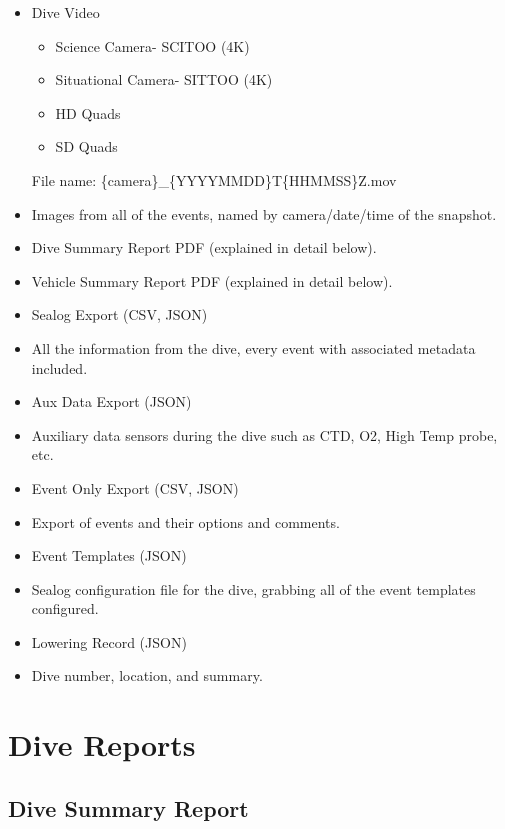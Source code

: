 \documentclass[
  letterpaper,
  DIV=11,
  numbers=noendperiod]{scrreprt}
\providecommand{\tightlist}{%
  \setlength{\itemsep}{0pt}\setlength{\parskip}{0pt}}\usepackage{longtable,booktabs,array}
\begin{document}
\begin{itemize}
\item
  Dive Video

  \begin{itemize}
  \tightlist
  \item
    Science Camera- SCITOO (4K)
  \item
    Situational Camera- SITTOO (4K)
  \item
    HD Quads
  \item
    SD Quads
  \end{itemize}

  File name: \{camera\}\_\{YYYYMMDD\}T\{HHMMSS\}Z.mov
\item
  Images from all of the events, named by camera/date/time of the
  snapshot.
\item
  Dive Summary Report PDF (explained in detail below).
\item
  Vehicle Summary Report PDF (explained in detail below).
\item
  Sealog Export (CSV, JSON)
\item
  All the information from the dive, every event with associated
  metadata included.
\item
  Aux Data Export (JSON)
\item
  Auxiliary data sensors during the dive such as CTD, O2, High Temp
  probe, etc.
\item
  Event Only Export (CSV, JSON)
\item
  Export of events and their options and comments.
\item
  Event Templates (JSON)
\item
  Sealog configuration file for the dive, grabbing all of the event
  templates configured.
\item
  Lowering Record (JSON)
\item
  Dive number, location, and summary.
\end{itemize}

\hypertarget{dive-reports}{%
\section{Dive Reports}\label{dive-reports}}

\hypertarget{dive-summary-report}{%
\subsection{Dive Summary Report}\label{dive-summary-report}}
\end{document}
